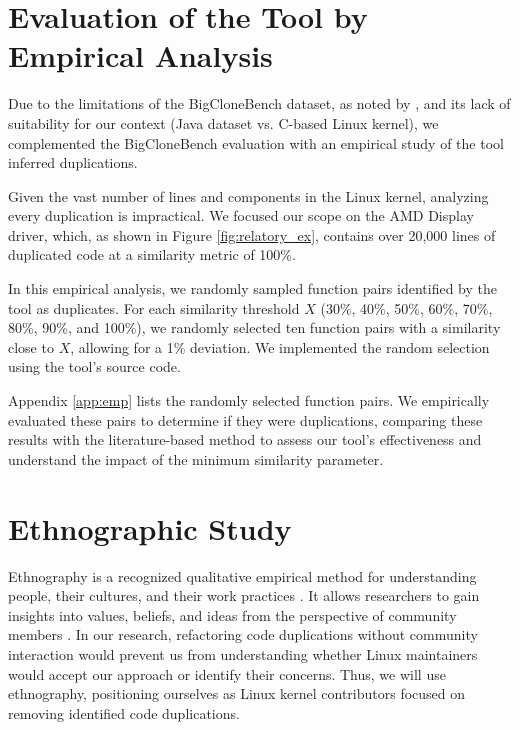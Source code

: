 \section{Evaluation of the Tool by Empirical Analysis}

\label{sec:metemp}

Due to the limitations of the BigCloneBench dataset, as noted by \cite{bigfail}, and its lack of suitability 
for our context (Java dataset vs. C-based Linux kernel), we complemented the BigCloneBench evaluation with 
an empirical study of the tool inferred duplications.

%
Given the vast number of lines and components in the Linux kernel, analyzing every duplication is impractical. We focused our scope on the AMD Display driver, which, as shown in Figure \ref{fig:relatory_ex}, contains over 20,000 lines of duplicated code at a similarity metric of 100\%.

In this empirical analysis, we randomly sampled function pairs identified by the tool as duplicates. For each similarity threshold \(X\) (30\%, 40\%, 50\%, 60\%, 70\%, 80\%, 90\%, and 100\%), we randomly selected ten function pairs with a similarity close to \(X\), allowing for a 1\% deviation. We implemented the random selection using the tool's source code.

Appendix \ref{app:emp} lists the randomly selected function pairs. We empirically evaluated these pairs to determine if they were duplications, comparing these results with the literature-based method to assess our tool's effectiveness and understand the impact of the minimum similarity parameter.

\section{Ethnographic Study}

\label{sec:meteth}

Ethnography is a recognized qualitative empirical method for understanding people, 
their cultures, and their work practices \citep{bookethno}. It allows researchers 
to gain insights into values, beliefs, and ideas from the perspective of community 
members \citep{ethnosoft}. In our research, refactoring code duplications without 
community interaction would prevent us from understanding whether Linux maintainers 
would accept our approach or identify their concerns. Thus, we will use ethnography, 
positioning ourselves as Linux kernel contributors focused on removing identified 
code duplications.

